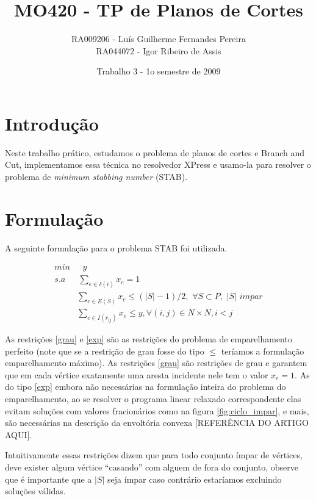\documentclass[11pt]{article}
\title{MO420 - TP de Planos de Cortes}
\author{RA009206 - Luís Guilherme Fernandes Pereira \\
RA044072 - Igor Ribeiro de Assis}
\date{Trabalho 3 - 1o semestre de 2009}
\begin{document}
\maketitle

\section{Introdução}

Neste trabalho prático, estudamos o problema de planos de cortes e
Branch and Cut, implementamos essa técnica no resolvedor XPress e
usamo-la para resolver o problema de \emph{minimum stabbing number}
(STAB).

\section{Formulação}

A seguinte formulação para o problema STAB foi utilizada.

\begin{align}
 min & \hspace{8pt}y\\
  s.a & \hspace{2pt}\sum_{e \in \delta (i)}{x_e} = 1 \label{grau} \\
      & \sum_{e \in E(S)}{x_e} \le (|S|-1)/2, \hspace{4pt} \forall S
  \subset P, \hspace{4pt} |S|
  \hspace{4pt} impar \label{exp} \\
      & \sum_{e \in I(r_{ij})}{x_e} \le y, \forall (i,j) \in N \times N,
    i < j \label{inter}
\end{align}

As restrições \eqref{grau} e \eqref{exp} são as restrições do problema
de emparelhamento perfeito (note que se a restrição de grau fosse do
tipo $\le$ teríamos a formulação emparelhamento máximo). As restrições
\eqref{grau} são restrições de grau e garantem que em cada vértice
exatamente uma aresta incidente nele tem o valor $x_e = 1$. As do tipo
\eqref{exp} embora não necessárias na formulação inteira do problema
do emparelhamento, ao se resolver o programa linear relaxado
correspondente elas evitam soluções com valores fracionários como na
figura \ref{fig:ciclo_impar}, e mais, são necessárias na descrição da
envoltória convexa [REFERÊNCIA DO ARTIGO AQUI].

Intuitivamente essas restrições dizem que para todo conjunto ímpar de
vértices, deve exister algum vértice ``casando'' com alguem de fora do
conjunto, observe que é importante que a $|S|$ seja ímpar caso
contrário estaríamos excluindo soluções válidas.
\end{document}
